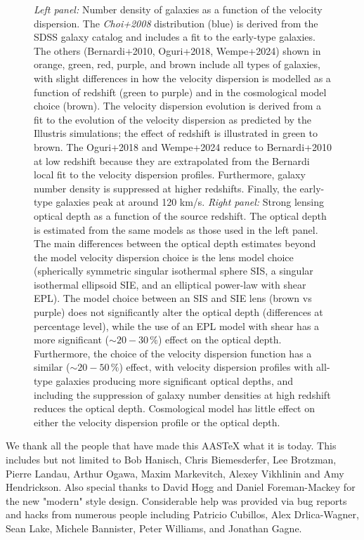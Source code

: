 \documentclass[linenumbers]{aastex631}
\begin{document}
\begin{figure}
  \caption{
    \emph{Left panel:} Number density of galaxies as a function of the velocity dispersion. %
    The \emph{Choi+2008} distribution (blue) is derived from the SDSS galaxy catalog and includes a fit to the early-type galaxies. 
    The others (Bernardi+2010, Oguri+2018, Wempe+2024) shown in orange, green, red, purple, and brown include all types of galaxies, with slight differences in how the velocity dispersion is modelled as a function of redshift (green to purple) and in the cosmological model choice (brown). 
    The velocity dispersion evolution is derived from a fit to the evolution of the velocity dispersion as predicted by the Illustris simulations; the effect of redshift is illustrated in green to brown. 
    The Oguri+2018 and Wempe+2024 reduce to Bernardi+2010 at low redshift because they are extrapolated from the Bernardi local fit to the velocity dispersion profiles. 
    Furthermore, galaxy number density is suppressed at higher redshifts. 
    Finally, the early-type galaxies peak at around 120 km/s. 
    \emph{Right panel:} Strong lensing optical depth as a function of the source redshift. %
    The optical depth is estimated from the same models as those used in the left panel. 
    The main differences between the optical depth estimates beyond the model velocity dispersion choice is the lens model choice (spherically symmetric singular isothermal sphere SIS, a singular isothermal ellipsoid SIE, and an elliptical power-law with shear EPL). 
    The model choice between an SIS and SIE lens (brown vs purple) does not significantly alter the optical depth (differences at percentage level), 
    while the use of an EPL model with shear has a more significant ($\sim 20-30\,\%$) effect on the optical depth. 
    Furthermore, the choice of the velocity dispersion function has a similar ($\sim 20-50\,\%$) effect, with velocity dispersion profiles with all-type galaxies producing more significant optical depths, and including the suppression of galaxy number densities at high redshift reduces the optical depth. 
    Cosmological model has little effect on either the velocity dispersion profile or the optical depth.
  }
  \label{fig:optical_depth_summary}
\end{figure}


\begin{acknowledgments}
We thank all the people that have made this AASTeX what it is today.  This
includes but not limited to Bob Hanisch, Chris Biemesderfer, Lee Brotzman,
Pierre Landau, Arthur Ogawa, Maxim Markevitch, Alexey Vikhlinin and Amy
Hendrickson. Also special thanks to David Hogg and Daniel Foreman-Mackey
for the new "modern" style design. Considerable help was provided via bug
reports and hacks from numerous people including Patricio Cubillos, Alex
Drlica-Wagner, Sean Lake, Michele Bannister, Peter Williams, and Jonathan
Gagne.
\end{acknowledgments}


{}

\end{document}
